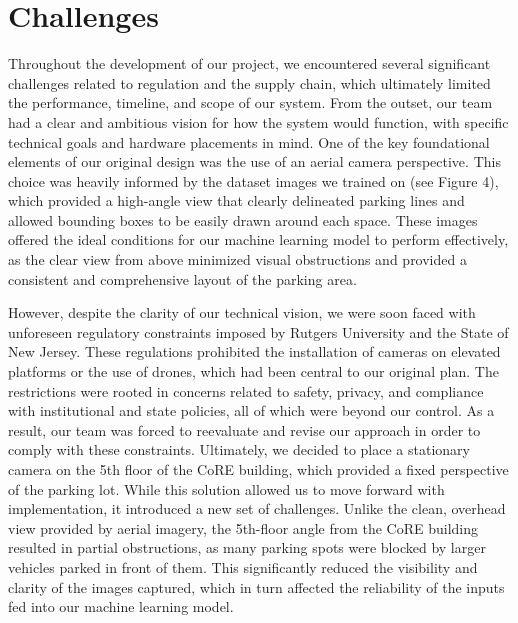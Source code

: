 \documentclass[conference]{IEEEtran}
\begin{document}
\section{Challenges}

Throughout the development of our project, we encountered several significant challenges related to regulation and the supply chain, which ultimately limited the performance, timeline, and scope of our system. From the outset, our team had a clear and ambitious vision for how the system would function, with specific technical goals and hardware placements in mind. One of the key foundational elements of our original design was the use of an aerial camera perspective. This choice was heavily informed by the dataset images we trained on (see Figure 4), which provided a high-angle view that clearly delineated parking lines and allowed bounding boxes to be easily drawn around each space. These images offered the ideal conditions for our machine learning model to perform effectively, as the clear view from above minimized visual obstructions and provided a consistent and comprehensive layout of the parking area.

However, despite the clarity of our technical vision, we were soon faced with unforeseen regulatory constraints imposed by Rutgers University and the State of New Jersey. These regulations prohibited the installation of cameras on elevated platforms or the use of drones, which had been central to our original plan. The restrictions were rooted in concerns related to safety, privacy, and compliance with institutional and state policies, all of which were beyond our control. As a result, our team was forced to reevaluate and revise our approach in order to comply with these constraints. Ultimately, we decided to place a stationary camera on the 5th floor of the CoRE building, which provided a fixed perspective of the parking lot. While this solution allowed us to move forward with implementation, it introduced a new set of challenges. Unlike the clean, overhead view provided by aerial imagery, the 5th-floor angle from the CoRE building resulted in partial obstructions, as many parking spots were blocked by larger vehicles parked in front of them. This significantly reduced the visibility and clarity of the images captured, which in turn affected the reliability of the inputs fed into our machine learning model.
\end{document}
